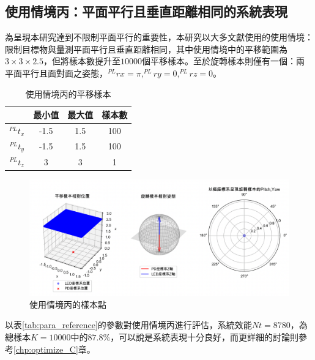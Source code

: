 \subsection{使用情境丙：平面平行且垂直距離相同的系統表現}
\label{chp:scene_C}

為呈現本研究達到不限制平面平行的重要性，本研究以大多文獻使用的使用情境：限制目標物與量測平面平行且垂直距離相同，其中使用情境中的平移範圍為$3\times 3\times 2.5$，但將樣本數提升至$10000$個平移樣本。至於旋轉樣本則僅有一個：兩平面平行且面對面之姿態，$^{PL}rx=\pi,^{PL}ry=0,^{PL}rz=0$。

\begin{table}[htpb]
    \begin{center}
      \caption{使用情境丙的平移樣本}
      \label{tab:C_translate}
      \begin{tabular}{c|c|c|c} %
         & \textbf{最小值} & \textbf{最大值}&\textbf{樣本數}\\
        \hline
        $^{PL}t_x$ & -1.5 &1.5&100\\
        $^{PL}t_y$ & -1.5 & 1.5&100\\
        $^{PL}t_z$ & 3 & 3 &1\\
      \end{tabular}
    \end{center}
  \end{table}

\begin{figure}[htpb]
    \centering
    \includegraphics[width=15cm]{ch4pic/c_scenario.png}
    \caption{使用情境丙的樣本點}
    \label{pic:c_scenario}
\end{figure}

以表\ref{tab:para_reference}的參數對使用情境丙進行評估，系統效能$Nt=8780$，為總樣本$K=10000$中的$87.8\%$，可以說是系統表現十分良好，而更詳細的討論則參考\ref{chp:optimize_C}章。

